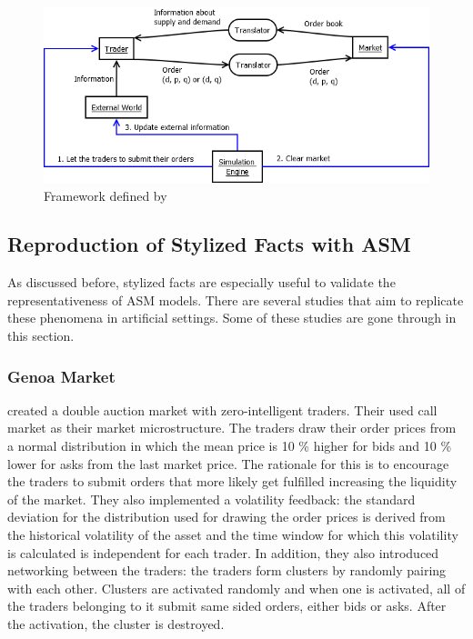 \begin{figure}
    \includegraphics[width=\linewidth]{diagrams/julien_market.png}
    \caption{Framework defined by \citet{Julien07}}
\end{figure}


\subsection{Reproduction of Stylized Facts with ASM}
As discussed before, stylized facts are especially useful
to validate the representativeness of ASM models. There are several 
studies that aim to replicate these phenomena in 
artificial settings. Some of these studies are
gone through in this section.
% 
\subsubsection{Genoa Market}

\citet{Genoa01} created a double auction market with zero-intelligent 
traders. Their used call market as their market microstructure. The traders draw their 
order prices from a normal distribution in which the mean price is 10 \%
higher for bids and 10 \% lower for asks from the last market price. The
rationale for this is to encourage the traders to submit orders that more likely get 
fulfilled increasing the liquidity of the market.
They also implemented a volatility feedback: the standard deviation for 
the distribution used for drawing the order prices is derived from the 
historical volatility of the asset and the time window for which this
volatility is calculated is independent for each trader. In addition,
they also introduced networking between the traders: the traders
form clusters by randomly pairing with each other. Clusters are activated
randomly and when one is activated, all of the traders belonging to it
submit same sided orders, either bids or asks. After the activation, the cluster is destroyed.

